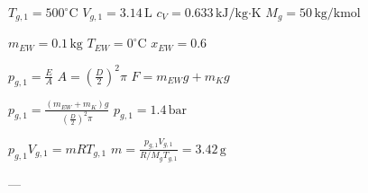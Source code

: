 \( T_{g,1} = 500^\circ \text{C} \)  
\( V_{g,1} = 3.14 \, \text{L} \)  
\( c_V = 0.633 \, \text{kJ/kg·K} \)  
\( M_g = 50 \, \text{kg/kmol} \)  

\( m_{EW} = 0.1 \, \text{kg} \)  
\( T_{EW} = 0^\circ \text{C} \)  
\( x_{EW} = 0.6 \)  

\( p_{g,1} = \frac{E}{A} \)  
\( A = \left(\frac{D}{2}\right)^2 \pi \)  
\( F = m_{EW} g + m_K g \)  

\( p_{g,1} = \frac{(m_{EW} + m_K) g}{\left(\frac{D}{2}\right)^2 \pi} \)  
\( p_{g,1} = 1.4 \, \text{bar} \)  

\( p_{g,1} V_{g,1} = m R T_{g,1} \)  
\( m = \frac{p_{g,1} V_{g,1}}{R / M_g T_{g,1}} = 3.42 \, \text{g} \)  

---